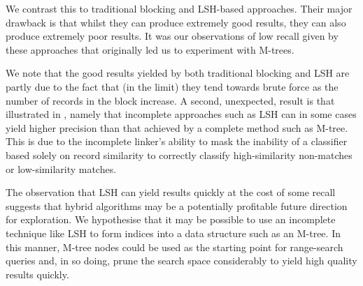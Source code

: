 \documentclass{llncs}
\begin{document}
We contrast this to traditional blocking and LSH-based approaches. Their
major drawback is that whilst they can produce extremely good results,
they can also produce extremely poor results. It was our observations of
low recall given by these approaches that originally led us to
experiment with M-trees.

We note that the good results yielded by both traditional blocking and
LSH are partly due to the fact that (in the limit) they tend towards
brute force as the number of records in the block increase. A second,
unexpected, result is that illustrated in
, namely that incomplete approaches
such as LSH can in some cases yield higher precision than that achieved
by a complete method such as M-tree. This is due to the incomplete
linker's ability to mask the inability of a classifier based solely on
record similarity to correctly classify high-similarity non-matches or
low-similarity matches.

The observation that LSH can yield results quickly at the cost of some
recall suggests that hybrid algorithms may be a potentially profitable
future direction for exploration. We hypothesise that it may be possible
to use an incomplete technique like LSH to form indices into a data
structure such as an M-tree. In this manner, M-tree nodes could be used
as the starting point for range-search queries and, in so doing, prune
the search space considerably to yield high quality results quickly.



 

\end{document}

